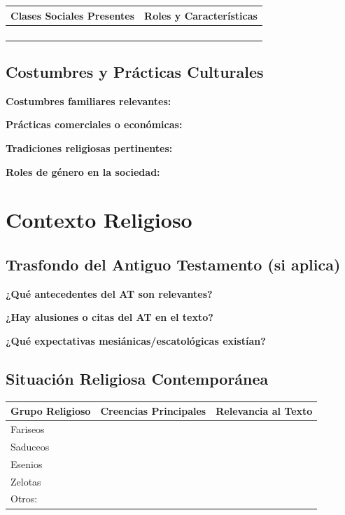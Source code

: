 \documentclass[11pt,a4paper]{article}
\begin{document}
\begin{tabularx}{\textwidth}{|X|X|}
\hline
\textbf{Clases Sociales Presentes} & \textbf{Roles y Características} \\
\hline
& \\[1.5cm]
\hline
& \\[1.5cm]
\hline
& \\[1.5cm]
\hline
& \\[1.5cm]
\hline
\end{tabularx}

\subsection{Costumbres y Prácticas Culturales}

\textbf{Costumbres familiares relevantes:}
\vspace{2cm}

\textbf{Prácticas comerciales o económicas:}
\vspace{2cm}

\textbf{Tradiciones religiosas pertinentes:}
\vspace{2cm}

\textbf{Roles de género en la sociedad:}
\vspace{2cm}

\newpage

\section{Contexto Religioso}

\subsection{Trasfondo del Antiguo Testamento (si aplica)}

\textbf{¿Qué antecedentes del AT son relevantes?}
\vspace{2cm}

\textbf{¿Hay alusiones o citas del AT en el texto?}
\vspace{2cm}

\textbf{¿Qué expectativas mesiánicas/escatológicas existían?}
\vspace{2cm}

\subsection{Situación Religiosa Contemporánea}

\begin{tabularx}{\textwidth}{|X|X|X|}
\hline
\textbf{Grupo Religioso} & \textbf{Creencias Principales} & \textbf{Relevancia al Texto} \\
\hline
Fariseos & & \\[1cm]
\hline
Saduceos & & \\[1cm]
\hline
Esenios & & \\[1cm]
\hline
Zelotas & & \\[1cm]
\hline
Otros: & & \\[1cm]
\hline
\end{tabularx}
\end{document}
